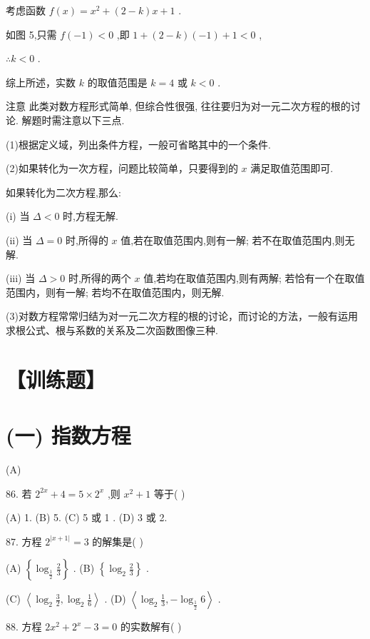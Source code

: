 \documentclass[10pt]{article}
\begin{document}
考虑函数 \(f\left( x\right)  = {x}^{2} + \left( {2 - k}\right) x + 1\) .

如图 5,只需 \(f\left( {-1}\right)  < 0\) ,即 \(1 + \left( {2 - k}\right) \left( {-1}\right)  + 1 < 0\) ,

\(\therefore k < 0\) .

综上所述，实数 \(k\) 的取值范围是 \(k = 4\) 或 \(k < 0\) .

注意 此类对数方程形式简单, 但综合性很强, 往往要归为对一元二次方程的根的讨论. 解题时需注意以下三点.

(1)根据定义域，列出条件方程，一般可省略其中的一个条件.

(2)如果转化为一次方程，问题比较简单，只要得到的 \(x\) 满足取值范围即可.

如果转化为二次方程,那么:

(i) 当 \(\Delta  < 0\) 时,方程无解.

(ii) 当 \(\Delta  = 0\) 时,所得的 \(x\) 值,若在取值范围内,则有一解; 若不在取值范围内,则无解.

(iii) 当 \(\Delta  > 0\) 时,所得的两个 \(x\) 值,若均在取值范围内,则有两解; 若恰有一个在取值范围内，则有一解; 若均不在取值范围内，则无解.

(3)对数方程常常归结为对一元二次方程的根的讨论，而讨论的方法，一般有运用求根公式、根与系数的关系及二次函数图像三种.

\section*{【训练题】}

\section*{(一) 指数方程}

(A)

86. 若 \({2}^{2x} + 4 = 5 \times  {2}^{x}\) ,则 \({x}^{2} + 1\) 等于( )

(A) 1. (B) 5. (C) 5 或 1 . (D) 3 或 2.

87. 方程 \({2}^{\left| x + 1\right| } = 3\) 的解集是( )

(A) \(\left\{  {{\log }_{\frac{1}{2}}\frac{2}{3}}\right\}\) . (B) \(\left\{  {{\log }_{2}\frac{2}{3}}\right\}\) .

(C) \(\left\langle  {{\log }_{2}\frac{3}{2},{\log }_{2}\frac{1}{6}}\right\rangle\) . (D) \(\left\langle  {{\log }_{2}\frac{1}{3}, - {\log }_{\frac{1}{2}}6}\right\rangle\) .

88. 方程 \(2{x}^{2} + {2}^{x} - 3 = 0\) 的实数解有( )
\end{document}
